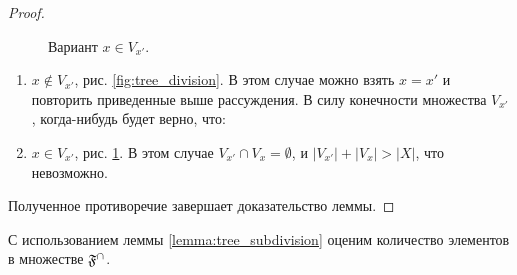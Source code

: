 \begin{proof}
\begin{figure}[htb!]
\begin{minipage}[b]{6cm}
\caption{Вариант $x \in V_{x'}$.}
\label{fig:tree_division_2}
\end{minipage}
\end{figure}

\begin{enumerate}
\item $x \notin V_{x'}$, рис. \ref{fig:tree_division}. В этом случае можно взять $x = x'$ и повторить приведенные выше рассуждения. В силу конечности множества $V_{x'}$, когда-нибудь будет верно, что:
\item $x \in V_{x'}$, рис. \ref{fig:tree_division_2}. В этом случае $V_{x'} \cap V_x = \emptyset$, и $|V_{x'}| + |V_x| > |X|$, что невозможно.
\end{enumerate}
Полученное противоречие завершает доказательство леммы.
\end{proof}
\vspace{1cm}



С использованием леммы \ref{lemma:tree_subdivision} оценим количество элементов в множестве $\mathfrak{F}^{\cap}$.



